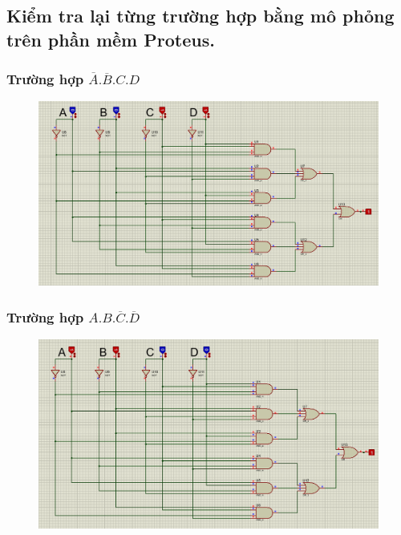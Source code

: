 \subsection{Kiểm tra lại từng trường hợp bằng mô phỏng trên phần mềm Proteus.}
\subsubsection{Trường hợp $\overline{A}.\overline{B}.C.D$}
\begin{figure}[H]
    \centering
    \includegraphics[width=\textwidth]{pictures/b2.2.png}
\end{figure}
\subsubsection{Trường hợp $A.B.\overline{C}.\overline{D}$}
\begin{figure}[H]
    \centering
    \includegraphics[width=\textwidth]{pictures/b2.1.png}
\end{figure}
